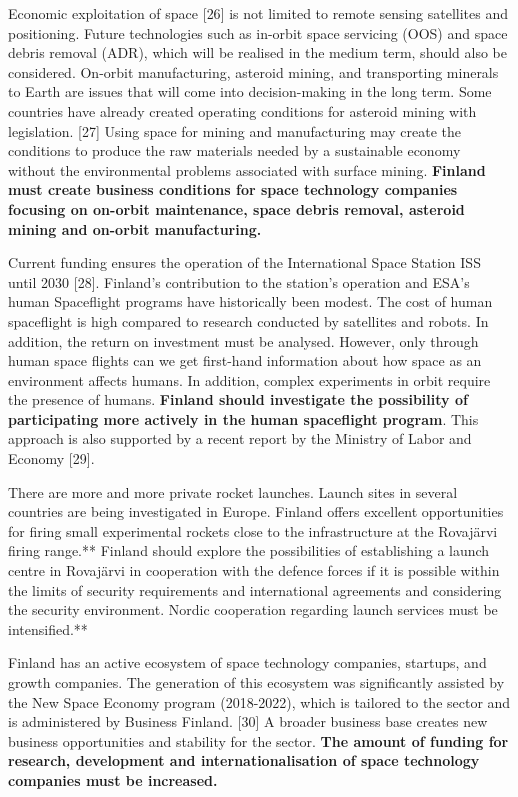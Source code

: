 Economic exploitation of space {[}26{]} is not limited to remote sensing
satellites and positioning. Future technologies such as in-orbit space
servicing (OOS) and space debris removal (ADR), which will be realised
in the medium term, should also be considered. On-orbit manufacturing,
asteroid mining, and transporting minerals to Earth are issues that will
come into decision-making in the long term. Some countries have already
created operating conditions for asteroid mining with legislation.
{[}27{]} Using space for mining and manufacturing may create the
conditions to produce the raw materials needed by a sustainable economy
without the environmental problems associated with surface mining.
\textbf{Finland must create business conditions for space technology
companies focusing on on-orbit maintenance, space debris removal,
asteroid mining and on-orbit manufacturing.}

Current funding ensures the operation of the International Space Station
ISS until 2030 {[}28{]}. Finland's contribution to the station's
operation and ESA's human Spaceflight programs have historically been
modest. The cost of human spaceflight is high compared to research
conducted by satellites and robots. In addition, the return on
investment must be analysed. However, only through human space flights
can we get first-hand information about how space as an environment
affects humans. In addition, complex experiments in orbit require the
presence of humans. \textbf{Finland should investigate the possibility
of participating more actively in the human spaceflight program}. This
approach is also supported by a recent report by the Ministry of Labor
and Economy {[}29{]}.

There are more and more private rocket launches. Launch sites in several
countries are being investigated in Europe. Finland offers excellent
opportunities for firing small experimental rockets close to the
infrastructure at the Rovajärvi firing range.** Finland should explore
the possibilities of establishing a launch centre in Rovajärvi in
\hspace{0pt}\hspace{0pt}cooperation with the defence forces if it is
possible within the limits of security requirements and international
agreements and considering the security environment. Nordic cooperation
regarding launch services must be intensified.**

Finland has an active ecosystem of space technology companies, startups,
and growth companies. The generation of this ecosystem was significantly
assisted by the New Space Economy program (2018-2022), which is tailored
to the sector and is administered by Business Finland. {[}30{]} A
broader business base creates new business opportunities and stability
for the sector. \textbf{The amount of funding for research, development
and internationalisation of space technology companies must be
increased.}

